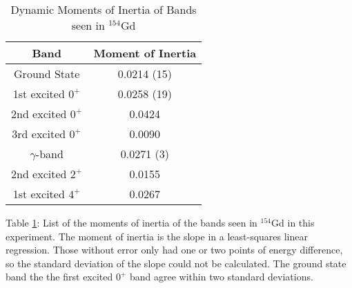 \begin{table}[!]
    \centering
    \caption{Dynamic Moments of Inertia of Bands seen in $^{154}$Gd}
    \begin{tabular}{c|c}
        \toprule
        Band & Moment of Inertia  \\
        \hline
        Ground State & 0.0214 (15) \\
        1st excited $0^+$ & 0.0258 (19) \\
        2nd excited $0^+$ & 0.0424 \\
        3rd excited $0^+$ & 0.0090 \\
        $\gamma$-band & 0.0271 (3) \\
        2nd excited $2^+$ & 0.0155 \\
        1st excited $4^+$ & 0.0267 \\
        \bottomrule
    \end{tabular}
    \footnotesize
    \item Table \ref{tab:154_Dynamic}: List of the moments of inertia of the bands seen in $^{154}$Gd in this experiment. The moment of inertia is the slope in a least-squares linear regression. Those without error only had one or two points of energy difference, so the standard deviation of the slope could not be calculated. The ground state band the the first excited $0^+$ band agree within two standard deviations.
    \label{tab:154_Dynamic}
\end{table}